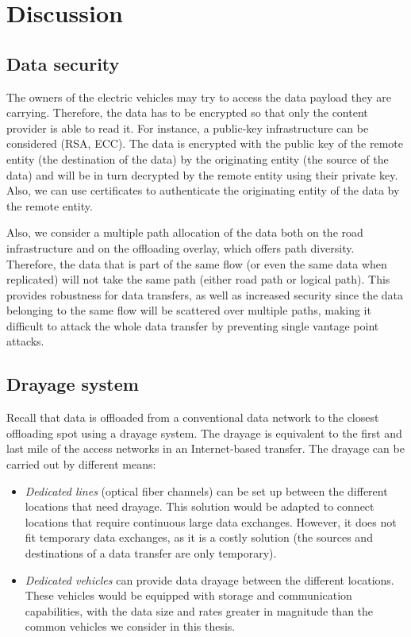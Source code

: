 \section{Discussion}
\label{sec:discuss}

\subsection{Data security}

The owners of the electric vehicles may try to access the data payload they are carrying. Therefore, the data has to be encrypted so that only the content provider is able to read it. For instance, a public-key infrastructure can be considered (\eg RSA, ECC). The data is encrypted with the public key of the remote entity (the destination of the data) by the originating entity (the source of the data) and will be in turn decrypted by the remote entity using their private key. Also, we can use certificates to authenticate the originating entity of the data by the remote entity.  

Also, we consider a multiple path allocation of the data both on the road infrastructure and on the offloading overlay, which offers path diversity. Therefore, the data that is part of the same flow (or even the same data when replicated) will not take the same path (either road path or logical path). This provides robustness for data transfers, as well as increased security since the data belonging to the same flow will be scattered over multiple paths, making it difficult to attack the whole data transfer by preventing single vantage point attacks.

\subsection{Drayage system}

Recall that data is offloaded from a conventional data network to the closest offloading spot using a drayage system. The drayage is equivalent to the first and last mile of the access networks in an Internet-based transfer. The drayage can be carried out by different means:

\begin{itemize}
    
    \item \textit{Dedicated lines} (\eg optical fiber channels) can be set up between the different locations that need drayage. This solution would be adapted to connect locations that require continuous large data exchanges. However, it does not fit temporary data exchanges, as it is a costly solution (\eg the sources and destinations of a data transfer are only temporary). 

    \item \textit{Dedicated vehicles} can provide data drayage between the different locations. These vehicles would be equipped with storage and communication capabilities, with the data size and rates greater in magnitude than the common vehicles we consider in this thesis.

\end{itemize}


